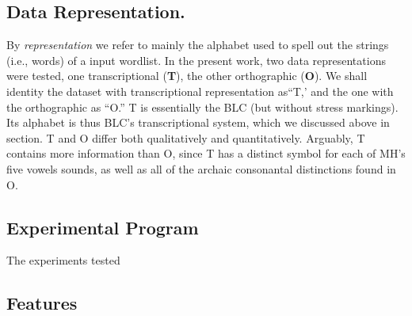 \subsection {Data Representation.} 
By \emph{representation} we refer to mainly the alphabet used to spell out the strings (i.e., words) 
of a input wordlist.
In the present work, two data representations were tested, one transcriptional 
(\textbf{T}), the other orthographic (\textbf{O}). We shall identity the dataset with transcriptional representation as``T,' and
the one with the orthographic as ``O.''
T is essentially the BLC (but without stress markings). Its alphabet is thus BLC's 
transcriptional system, which we discussed above in section. %
T and O differ both qualitatively and quantitatively. 
Arguably, T contains more information than O,
since T has a distinct symbol for each of MH's five vowels sounds, %
as well as all of the archaic consonantal distinctions found in O.

\subsection{Experimental Program}
The experiments tested 

\subsection{Features}\label{sec:expvars:features}
\label{sec:features}


%
%



